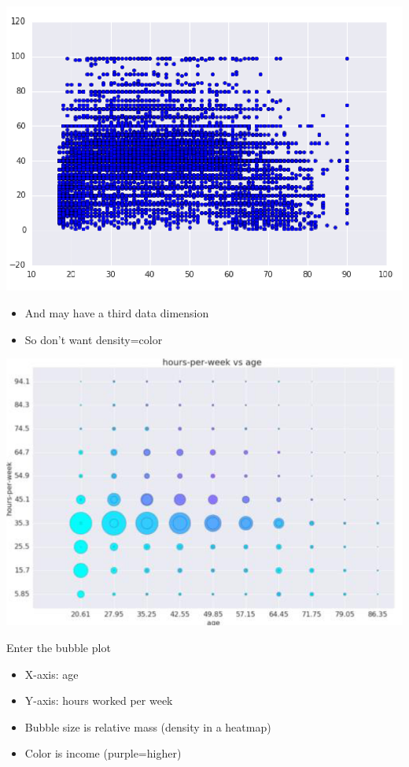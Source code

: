 \documentclass[11pt]{article}
\theoremstyle{definition}
\begin{document}
\includegraphics[width=\textwidth/2]{27.png}
\begin{itemize}
  \item And may have a third data
  dimension
  \item So don’t want density=color
\end{itemize}

\includegraphics[width=\textwidth/2]{28.png}

Enter the bubble plot
\begin{itemize}
  \item X-axis: age
  \item Y-axis: hours worked per week
  \item Bubble size is relative mass
  (density in a heatmap)
  \item Color is income (purple=higher)
\end{itemize}
\end{document}
